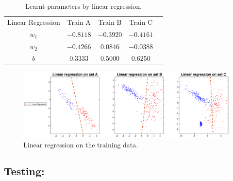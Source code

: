 \documentclass[a4paper,10pt]{article}
\theoremstyle{exostyle}
\begin{document}
\begin{table}[!h]
\centering
\caption{Learnt parameters by linear regression.}
\begin{tabular}{|c|c|c|c|l}
\cline{1-4}
Linear Regression & Train A & Train B & Train C &  \\ \cline{1-4}
$w_1 $            &   $-0.8118$    &       $-0.3920 $    &    $-0.4161$     &  \\ \cline{1-4}
$w_2$                &    $-0.4266 $     &    $ 0.0846$     &   $-0.0388$      &  \\ \cline{1-4}
$ b $                &    $0.3333$     &     $0.5000$    &   $0.6250$      &  \\ \cline{1-4}
\end{tabular}
\end{table}



\begin{figure}[!h]
\includegraphics[width=\textwidth]{classification_data_HWK1/classification_data_HWK1/LinR.eps} 
\caption{Linear regression on the training data.}
\end{figure}

\newpage
\subsection{Testing:}
\end{document}

